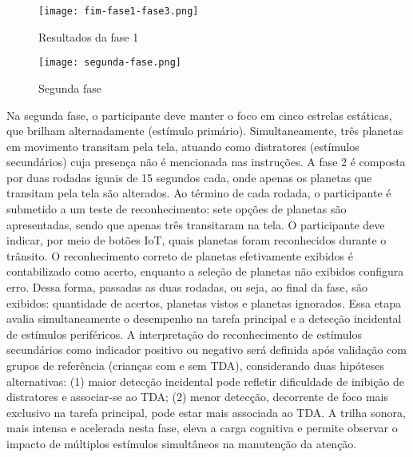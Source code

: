 \begin{figure}[H]
    \centering
    \caption{Resultados da fase 1}%
    \label{fig:fim-fase1-fase3}
    \texttt{[image: fim-fase1-fase3.png]}%
\end{figure}

\begin{figure}[H]
    \centering
    \caption{Segunda fase}%
    \label{fig:segunda-fase}
    \texttt{[image: segunda-fase.png]}%
\end{figure}

Na segunda fase, o participante deve manter o foco em cinco estrelas estáticas, que brilham alternadamente (estímulo primário). Simultaneamente, três planetas em movimento transitam pela tela, atuando como distratores (estímulos secundários) cuja presença não é mencionada nas instruções. A fase 2 é composta por duas rodadas iguais de 15 segundos cada, onde apenas os planetas que transitam pela tela são alterados. Ao término de cada rodada, o participante é submetido a um teste de reconhecimento: sete opções de planetas são apresentadas, sendo que apenas três transitaram na tela. O participante deve indicar, por meio de botões IoT, quais planetas foram reconhecidos durante o trânsito. O reconhecimento correto de planetas efetivamente exibidos é contabilizado como acerto, enquanto a seleção de planetas não exibidos configura erro. Dessa forma, passadas as duas rodadas, ou seja, ao final da fase, são exibidos: quantidade de acertos, planetas vistos e planetas ignorados. Essa etapa avalia simultaneamente o desempenho na tarefa principal e a detecção incidental de estímulos periféricos. A interpretação do reconhecimento de estímulos secundários como indicador positivo ou negativo será definida após validação com grupos de referência (crianças com e sem TDA), considerando duas hipóteses alternativas: (1) maior detecção incidental pode refletir dificuldade de inibição de distratores e associar-se ao TDA; (2) menor detecção, decorrente de foco mais exclusivo na tarefa principal, pode estar mais associada ao TDA. A trilha sonora, mais intensa e acelerada nesta fase, eleva a carga cognitiva e permite observar o impacto de múltiplos estímulos simultâneos na manutenção da atenção.

